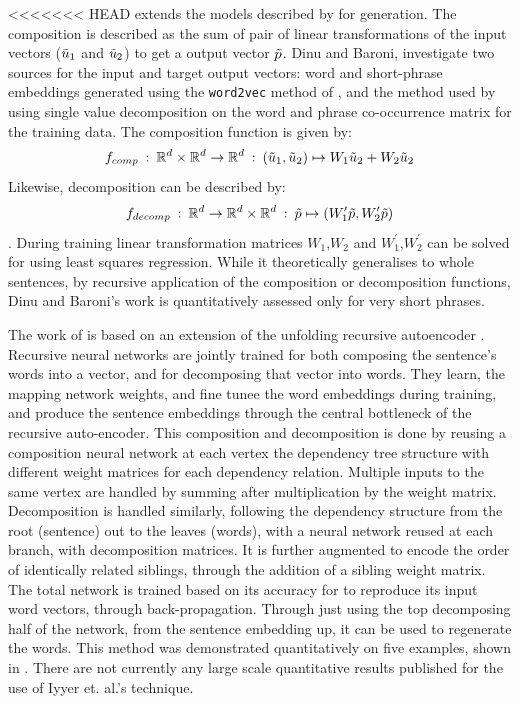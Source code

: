 \documentclass[11pt]{article}
\theoremstyle{plain}
\theoremstyle{definition}
\begin{document}
<<<<<<< HEAD
\textcite{Dinu2014CompositionalGeneration}  extends the models described by \textcite{zanzotto2010estimating, Guevara2010} for generation. The composition is described as the sum of pair of linear transformations of the input vectors ($\tilde{u}_1$ and $\tilde{u}_2$) to get a output vector $\p$. Dinu and Baroni, investigate two sources for the input and target output vectors: word and short-phrase embeddings generated using the \texttt{word2vec} method of \cite{mikolov2013efficient}, and the method used by \textcite{Guevara2010} using single value decomposition on the word and phrase co-occurrence matrix for the training data. The composition function is given by:  $$f_{comp}\::\:\mathbb{R}^d\times\mathbb{R}^d \to \mathbb{R}^d\::\: (\tilde{u}_1, \tilde{u}_2)\mapsto W_1\tilde{u}_2+W_2\tilde{u}_2$$
Likewise, decomposition can be described by: $$f_{decomp}\::\:\mathbb{R}^d\to \mathbb{R}^d\times\mathbb{R}^d \::\: \p \mapsto (W^\prime_1\p, W^\prime_2\p)$$.
During training linear transformation matrices $W_1$,$W_2$ and $W_1^\prime$,$W_2^\prime$ can be solved for using least squares regression.
While it theoretically generalises to whole sentences, by recursive application of the composition or decomposition functions, Dinu and Baroni's work is quantitatively assessed only for very short phrases.


\renewcommand{\p}{\tilde{p}}


The work of \textcite{iyyer2014generating} is based on an extension of the unfolding recursive autoencoder \textcite{SocherEtAl2011:PoolRAE}. Recursive neural networks are jointly trained for both composing the sentence's words into a vector, and for decomposing that vector into words. They learn, the mapping network weights, and fine tunee the word embeddings during training, and produce the sentence embeddings through the central bottleneck of the recursive auto-encoder. This composition and decomposition is done by reusing a composition neural network at each vertex the  dependency tree structure with different weight matrices for each dependency relation. Multiple inputs to the same vertex are handled by summing after multiplication by the weight matrix. 
Decomposition is handled similarly, following the dependency structure from the root (sentence) out to the leaves (words), with a neural network reused at each branch, with decomposition matrices. It is further augmented to encode the order of identically related siblings, through the addition of a sibling weight matrix. The total network is trained based on its accuracy for to reproduce its input word vectors, through back-propagation. Through just using the top decomposing half of the network, from the sentence embedding up, it can be used to regenerate the words. This method was demonstrated quantitatively on five examples, shown in . There are not currently any large scale quantitative results published for the use of Iyyer et. al.'s technique.
\end{document}
